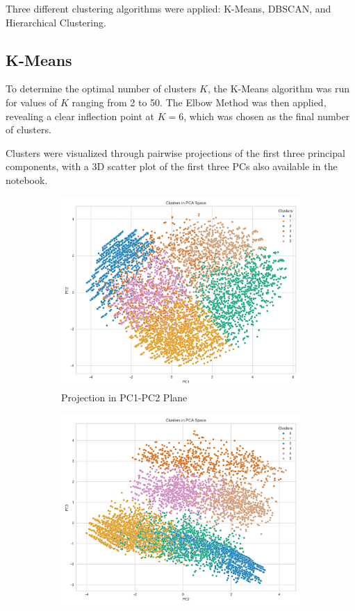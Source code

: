 \documentclass[a4paper,11pt]{article}
\begin{document}
Three different clustering algorithms were applied: K-Means, DBSCAN, and Hierarchical Clustering.

\subsection{K-Means}
To determine the optimal number of clusters $K$, the K-Means algorithm was run for values of $K$ ranging from 2 to 50. The Elbow Method was then applied, revealing a clear inflection point at $K = 6$, which was chosen as the final number of clusters.

Clusters were visualized through pairwise projections of the first three principal components, with a 3D scatter plot of the first three PCs also available in the notebook.

\begin{figure}[h]
    \centering
    \begin{subfigure}{0.32\linewidth}
        \includegraphics[width=\textwidth]{figures/clustering/6-means_pca_12.png}
        \caption{Projection in PC1-PC2 Plane}
        \label{fig:cluster_12}
    \end{subfigure}
    \hfill
    \begin{subfigure}{0.32\linewidth}
        \includegraphics[width=\textwidth]{figures/clustering/6-means_pca_23.png}

\end{subfigure}
\end{figure}
\end{document}
